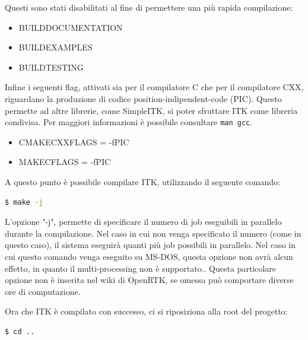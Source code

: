 \documentclass[a4paper,12pt, doubleside]{report}
\begin{document}
                    Questi sono stati disabilitati al fine di permettere una più rapida compilazione:
                    
                    \begin{itemize}
                        \item BUILD\textunderscore DOCUMENTATION
                        \item BUILD\textunderscore EXAMPLES
                        \item BUILD\textunderscore TESTING
                    \end{itemize}
                    
                    Infine i seguenti flag, attivati sia per il compilatore C che per il compilatore CXX, riguardano la produzione di codice position-indipendent-code (PIC). Questo permette ad altre librerie, come SimpleITK, si poter sfruttare ITK come libreria condivisa. Per maggiori informazioni è possibile consultare \texttt{man gcc}. 
                    
                    \begin{itemize}
                        \item CMAKE\textunderscore CXX\textunderscore FLAGS = -fPIC
                        \item MAKE\textunderscore C\textunderscore FLAGS = -fPIC
                    \end{itemize}
                    
                    \bigskip
                    A questo punto è possibile compilare ITK, utilizzando il seguente comando:
                    \begin{lstlisting}[language=bash, frame=bt]
$ make -j
                    \end{lstlisting}
                    
                    L'opzione "-j", permette di specificare il numero di job eseguibili in parallelo durante la compilazione. Nel caso in cui non venga specificato il numero (come in questo caso), il sistema eseguirà quanti più job possibili in parallelo. Nel caso in cui questo comando venga eseguito su MS-DOS, questa opzione non avrà alcun effetto, in quanto il multi-processing non è supportato.\cite{-j-gnu-docs}. Questa particolare opzione non è inserita nel wiki di OpenRTK, se omessa può comportare diverse ore di computazione.
                    
                    Ora che ITK è compilato con successo, ci si riposiziona alla root del progetto:
                    \begin{lstlisting}[language=bash, frame=bt]
$ cd ..
                    \end{lstlisting}
            
\end{document}
